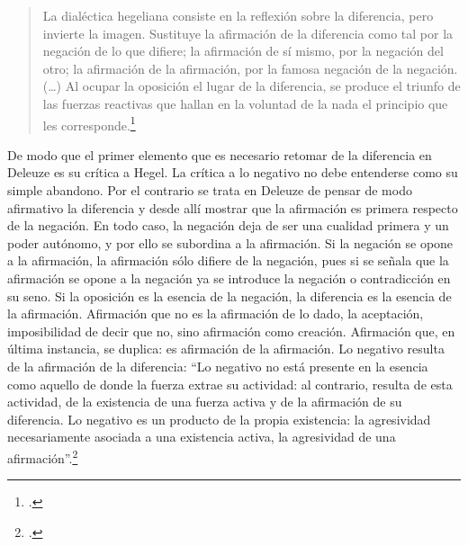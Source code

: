 \begin{quote}
La dialéctica hegeliana consiste en la reflexión sobre la diferencia, pero invierte la imagen. Sustituye la afirmación de la diferencia como tal por la negación de lo que difiere; la afirmación de sí mismo, por la negación del otro; la afirmación de la afirmación, por la famosa negación de la negación. (\dots) Al ocupar la oposición el lugar de la diferencia, se produce el triunfo de las fuerzas reactivas que hallan en la voluntad de la nada el principio que les corresponde.\footcite[272]{@6973-DELEUZE1998}
\end{quote}

De modo que el primer elemento que es necesario retomar de la diferencia en Deleuze es su crítica a Hegel. La crítica a lo negativo no debe entenderse como su simple abandono. Por el contrario se trata en Deleuze de pensar de modo afirmativo la diferencia y desde allí mostrar que la afirmación es primera respecto de la negación. En todo caso, la negación deja de ser una cualidad primera y un poder autónomo, y por ello se subordina a la afirmación. Si la negación se opone a la afirmación, la afirmación sólo difiere de la negación, pues si se señala que la afirmación se opone a la negación ya se introduce la negación o contradicción en su seno. Si la oposición es la esencia de la negación, la diferencia es la esencia de la afirmación. Afirmación que no es la afirmación de lo dado, la aceptación, imposibilidad de decir que no, sino afirmación como creación. Afirmación que, en última instancia, se duplica: es afirmación de la afirmación. Lo negativo resulta de la afirmación de la diferencia: \enquote{Lo negativo no está presente en la esencia como aquello de donde la fuerza extrae su actividad: al contrario, resulta de esta actividad, de la existencia de una fuerza activa y de la afirmación de su diferencia. Lo negativo es un producto de la propia existencia: la agresividad necesariamente asociada a una existencia activa, la agresividad de una afirmación}.\footcite[17]{@6973-DELEUZE1998}

